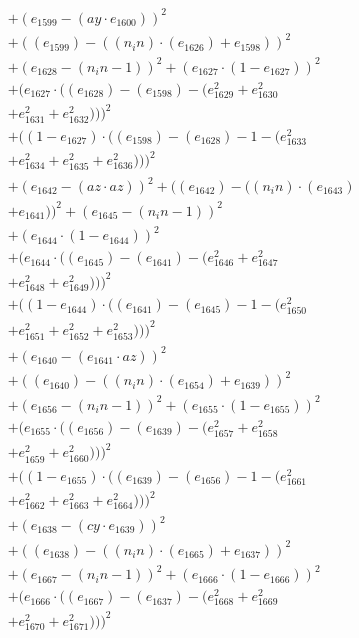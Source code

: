 \documentclass[10pt, a4paper]{article}
\begin{document}
\begin{align*}
& + (e_{1599} - (ay  \cdot  e_{1600}))^{2} \\
& + ((e_{1599}) - ((n_in)  \cdot  (e_{1626}) + e_{1598}))^{2} \\
& + (e_{1628} - (n_in - 1))^{2} + (e_{1627}  \cdot  (1 - e_{1627}))^{2} \\
& + (e_{1627}  \cdot  ((e_{1628}) - (e_{1598}) - (e_{1629}^{2} + e_{1630}^{2} \\
& + e_{1631}^{2} + e_{1632}^{2})))^{2} \\
& + ((1 - e_{1627})  \cdot  ((e_{1598}) - (e_{1628}) - 1 - (e_{1633}^{2} \\
& + e_{1634}^{2} + e_{1635}^{2} + e_{1636}^{2})))^{2} \\
& + (e_{1642} - (az  \cdot  az))^{2} + ((e_{1642}) - ((n_in)  \cdot  (e_{1643}) \\
& + e_{1641}))^{2} + (e_{1645} - (n_in - 1))^{2} \\
& + (e_{1644}  \cdot  (1 - e_{1644}))^{2} \\
& + (e_{1644}  \cdot  ((e_{1645}) - (e_{1641}) - (e_{1646}^{2} + e_{1647}^{2} \\
& + e_{1648}^{2} + e_{1649}^{2})))^{2} \\
& + ((1 - e_{1644})  \cdot  ((e_{1641}) - (e_{1645}) - 1 - (e_{1650}^{2} \\
& + e_{1651}^{2} + e_{1652}^{2} + e_{1653}^{2})))^{2} \\
& + (e_{1640} - (e_{1641}  \cdot  az))^{2} \\
& + ((e_{1640}) - ((n_in)  \cdot  (e_{1654}) + e_{1639}))^{2} \\
& + (e_{1656} - (n_in - 1))^{2} + (e_{1655}  \cdot  (1 - e_{1655}))^{2} \\
& + (e_{1655}  \cdot  ((e_{1656}) - (e_{1639}) - (e_{1657}^{2} + e_{1658}^{2} \\
& + e_{1659}^{2} + e_{1660}^{2})))^{2} \\
& + ((1 - e_{1655})  \cdot  ((e_{1639}) - (e_{1656}) - 1 - (e_{1661}^{2} \\
& + e_{1662}^{2} + e_{1663}^{2} + e_{1664}^{2})))^{2} \\
& + (e_{1638} - (cy  \cdot  e_{1639}))^{2} \\
& + ((e_{1638}) - ((n_in)  \cdot  (e_{1665}) + e_{1637}))^{2} \\
& + (e_{1667} - (n_in - 1))^{2} + (e_{1666}  \cdot  (1 - e_{1666}))^{2} \\
& + (e_{1666}  \cdot  ((e_{1667}) - (e_{1637}) - (e_{1668}^{2} + e_{1669}^{2} \\
& + e_{1670}^{2} + e_{1671}^{2})))^{2} \\

\end{align*}
\end{document}
